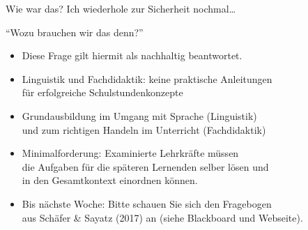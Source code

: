 \begin{frame}
  {Wie war das?}
  Ich wiederhole zur Sicherheit nochmal\ldots\\
  \vspace{\baselineskip}
  \pause
  \begin{center}
    \Large{}
  \end{center}
\end{frame}

\begin{frame}
  {"`Wozu brauchen wir das denn?"'}
  \pause
  \begin{itemize}[<+->]
    \item Diese Frage gilt hiermit als nachhaltig beantwortet.
    \item Linguistik und Fachdidaktik: keine praktische Anleitungen\\
      für erfolgreiche Schulstundenkonzepte
    \item Grundausbildung im \alert{Umgang mit Sprache} (Linguistik)\\
      und zum \alert{richtigen Handeln im Unterricht} (Fachdidaktik)
      \vspace{\baselineskip}
    \item Minimalforderung: \alert{Examinierte Lehrkräfte müssen\\
      die Aufgaben für die späteren Lernenden selber lösen und\\
      in den Gesamtkontext einordnen können.}
    \item \alert{Bis nächste Woche: Bitte schauen Sie sich den Fragebogen\\
      aus Schäfer \& Sayatz (2017) an (siehe Blackboard und Webseite).}
  \end{itemize}
\end{frame}

